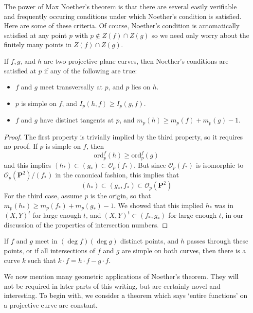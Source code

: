 The power of Max Noether's theorem is that there are several easily verifiable and frequently occuring conditions under which Noether's condition is satisfied. Here are some of these criteria. Of course, Noether's condition is automatically satisfied at any point $p$ with $p \not \in Z(f) \cap Z(g)$ so we need only worry about the finitely many points in $Z(f) \cap Z(g)$.

\begin{theorem}
    If $f,g$, and $h$ are two projective plane curves, then Noether's conditions are satisfied at $p$ if any of the following are true:
    \begin{itemize}
        \item $f$ and $g$ meet transversally at $p$, and $p$ lies on $h$.
        \item $p$ is simple on $f$, and $I_p(h,f) \geq I_p(g,f)$.
        \item $f$ and $g$ have distinct tangents at $p$, and $m_p(h) \geq m_p(f) + m_p(g) - 1$.
    \end{itemize}
\end{theorem}
\begin{proof}
    The first property is trivially implied by the third property, so it requires no proof. If $p$ is simple on $f$, then
    \[ \text{ord}_p^f(h) \geq \text{ord}_p^f(g) \]
    and this implies $(h_*) \subset (g_*) \subset \mathcal{O}_p(f_*)$. But since $\mathcal{O}_p(f_*)$ is isomorphic to $\mathcal{O}_p(\mathbf{P}^2)/(f_*)$ in the canonical fashion, this implies that
    \[ (h_*) \subset (g_*,f_*) \subset \mathcal{O}_p(\mathbf{P}^2) \]
    For the third case, assume $p$ is the origin, so that $m_p(h_*) \geq m_p(f_*) + m_p(g_*) - 1$. We showed that this implied $h_*$ was in $(X,Y)^t$ for large enough $t$, and $(X,Y)^t \subset (f_*,g_*)$ for large enough $t$, in our discussion of the properties of intersection numbers.
\end{proof}

\begin{corollary}
    If $f$ and $g$ meet in $(\deg f)(\deg g)$ distinct points, and $h$ passes through these points, or if all intersections of $f$ and $g$ are simple on both curves, then there is a curve $k$ such that $k \cdot f = h \cdot f - g \cdot f$.
\end{corollary}

We now mention many geometric applications of Noether's theorem. They will not be required in later parts of this writing, but are certainly novel and interesting. To begin with, we consider a theorem which says `entire functions' on a projective curve are constant.

